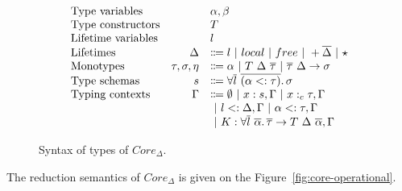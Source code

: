 \documentclass[11pt]{article}
\newcommand{\vor}{~|~}
\newcommand{\ap}{~}
\begin{document}
    \begin{figure}
        \[
            \begin{array}{lrl}
                \text{Type variables} && \alpha, \beta \\
                \text{Type constructors} && T \\
                \text{Lifetime variables} && l \\
                \text{Lifetimes} & \Delta &\Coloneqq l \vor local \vor free \vor +\overline{\Delta} \vor \star \\
                \text{Monotypes} & \tau, \sigma, \eta &\Coloneqq \alpha \vor T \ap \Delta \ap \overline{\tau} \vor \overline{\tau}~\Delta \to \sigma \\
                \text{Type schemas} & s &\Coloneqq \forall \overline{l}~\overline{(\alpha <: \tau)}\ldotp \sigma \\
                \text{Typing contexts} & \Gamma &\Coloneqq \emptyset \vor x : s, \Gamma \vor x :_c \tau, \Gamma \\
                & & \vor l <: \Delta, \Gamma \vor \alpha <: \tau, \Gamma \\
                & &\vor K : \forall \overline{l}\ \overline{\alpha}\ldotp \overline{\tau}\to T \ap\Delta\ap \overline{\alpha}, \Gamma
            \end{array}
        \]
        \caption{Syntax of types of $Core_\Delta$.}
        \label{fig:core-types}
    \end{figure}


    The reduction semantics of $Core_\Delta$ is given on the Figure\ \ref{fig:core-operational}.
\end{document}
